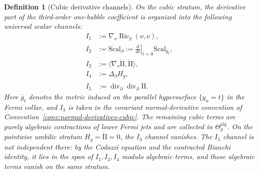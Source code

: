 \documentclass[11pt,reqno,a4paper]{amsart}
\DeclareMathOperator{\Ric}{Ric}
\numberwithin{equation}{section}
\theoremstyle{plain}
\newtheorem{definition}[theorem]{Definition}
\newcommand{\Scal}{\mathrm{Scal}}
\theoremstyle{remark}
\theoremstyle{plain}
\begin{document}
\begin{definition}[Cubic derivative channels]
\label{def:cubic-channels}
On the cubic stratum, the derivative part of the third-order one-bubble
coefficient is organized into the following universal scalar channels:
\begin{align*}
I_1&:=\nabla_\nu\Ric_g(\nu,\nu),\\
I_2&:=\dot{\Scal}_\partial
     :=\left.\frac{d}{dt}\right|_{t=0}\Scal_{\bar g_t},\\
I_3&:=\langle\nabla_\nu\mathring{\mathrm{II}},
              \mathring{\mathrm{II}}\rangle,\\
I_4&:=\Delta_\partial H_g,\\
I_5&:=\operatorname{div}_\partial
      \operatorname{div}_\partial\mathring{\mathrm{II}}.
\end{align*}
Here $\bar g_t$ denotes the metric induced on the parallel hypersurface
$\{y_n=t\}$ in the Fermi collar, and $I_3$ is taken in the covariant
normal-derivative convention of
Convention~\ref{conv:normal-derivatives-cubic}.  The remaining cubic terms are
purely algebraic contractions of lower Fermi jets and are collected in
$\Theta_g^{\mathrm{alg}}$.  On the pointwise umbilic stratum
$H_g=\mathring{\mathrm{II}}=0$, the $I_3$ channel vanishes.  The $I_5$
channel is not independent there: by the Codazzi equation and the contracted
Bianchi identity, it lies in the span of $I_1,I_2,I_4$ modulo algebraic terms,
and those algebraic terms vanish on the same stratum.
\end{definition}
\end{document}
